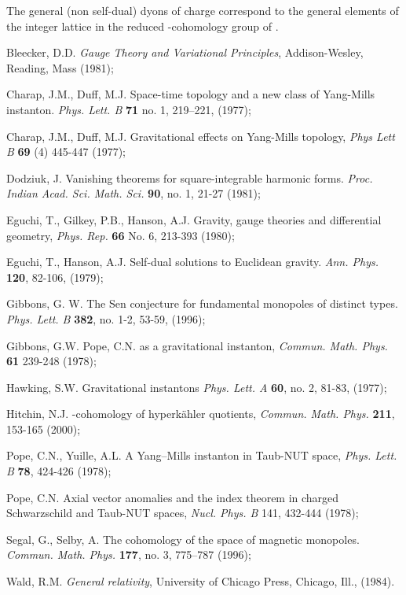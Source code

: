 \documentclass[a4paper,12pt,draft]{article}
\begin{document}
The general (non self-dual) dyons of charge \coordHE{} correspond to the
general elements of the integer lattice
\coordHE{} in the reduced
\coordHE{}-cohomology group of \coordHE{}. 


\begin{thebibliography}{Z}

 Bleecker, D.D. {\it Gauge Theory and Variational
Principles}, Addison-Wesley, Reading, Mass (1981);

 Charap, J.M., Duff, M.J. 
Space-time topology and a new class of Yang-Mills instanton. 
{\em Phys. Lett. B} {\bf 71} no. 1, 219--221, (1977); 

 Charap, J.M., Duff, M.J.  
    Gravitational effects on Yang-Mills topology,
    {\em Phys Lett B} {\bf 69} (4) 445-447 (1977); 

Dodziuk, J. Vanishing theorems for square-integrable harmonic forms. 
{\em Proc. Indian Acad. Sci. Math. Sci.} {\bf 90}, no. 1, 21-27 (1981);

 Eguchi, T., Gilkey, P.B., Hanson, A.J. Gravity,
gauge theories and differential geometry, {\it Phys. Rep.} {\bf 66} No. 6,
213-393 (1980);

 Eguchi, T., Hanson, A.J. Self-dual solutions to
Euclidean gravity. {\em Ann. Phys.} {\bf 120}, 82-106, (1979);

Gibbons, G. W.
The Sen conjecture for fundamental monopoles of distinct types. 
{\em Phys. Lett. B} {\bf 382}, no. 1-2, 53-59, (1996);

Gibbons, G.W. Pope, C.N. \coordHE{} as a gravitational
instanton, {\it Commun. Math. Phys.} {\bf 61} 239-248 (1978);

 Hawking, S.W. Gravitational instantons {\em Phys. 
Lett. A} {\bf 60},  no. 2, 81-83, (1977);

 Hitchin, N.J.  \coordHE{}-cohomology of hyperk\"ahler
quotients, {\em Commun. Math. Phys.} {\bf 211}, 153-165 (2000);

Pope, C.N., Yuille, A.L. A Yang--Mills instanton in
Taub-NUT space, {\it Phys. Lett. B} {\bf 78}, 424-426 (1978);

Pope, C.N. Axial vector anomalies and the index theorem in
charged Schwarzschild and Taub-NUT spaces, {\it Nucl. Phys. B} {141},
432-444 (1978); 

 Segal, G., Selby, A. 
The cohomology of the space of magnetic monopoles. 
{\it Commun. Math. Phys.} {\bf 177}, no. 3,
775--787 (1996);


 Wald, R.M. {\em General relativity}, 
University of Chicago Press, Chicago, Ill., (1984).

\end{thebibliography}
\end{document}
